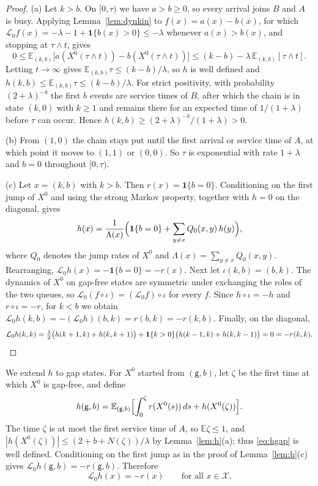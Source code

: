 \documentclass[11pt]{article}
\theoremstyle{definition}
\theoremstyle{remark}
\newcommand{\E}{\mathbb{E}}
\newcommand{\ind}{\mathbf{1}}
\newcommand{\cX}{\mathcal{X}}
\newcommand{\cL}{\mathcal{L}}
\newcommand{\gp}{\mathsf{g}}
\begin{document}
\begin{proof}
(a) Let $k>b$. On $[0,\tau)$ we have $a>b\ge0$, so every arrival joins $B$ and
$A$ is busy. Applying Lemma~\ref{lem:dynkin} to $f(x)=a(x)-b(x)$, for which
$\cL_0f(x)=-\lambda-1+\ind\{b(x)>0\}\le-\lambda$ whenever $a(x)>b(x)$, and
stopping at $\tau\wedge t$, gives
\[
  0\le\E_{(k,b)}\bigl[a(X^0(\tau\wedge t))-b(X^0(\tau\wedge t))\bigr]
  \le (k-b)-\lambda\,\E_{(k,b)}[\tau\wedge t].
\]
Letting $t\to\infty$ gives $\E_{(k,b)}\tau\le(k-b)/\lambda$, so $h$ is well
defined and $h(k,b)\le\E_{(k,b)}\tau\le(k-b)/\lambda$. For strict positivity,
with probability $(2+\lambda)^{-b}$ the first $b$ events are service times of
$B$, after which the chain is in state $(k,0)$ with $k\ge1$ and remains there
for an expected time of $1/(1+\lambda)$ before $\tau$ can occur. Hence
$h(k,b)\ge(2+\lambda)^{-b}/(1+\lambda)>0$.

(b) From $(1,0)$ the chain stays put until the first arrival or service time
of $A$, at which point it moves to $(1,1)$ or $(0,0)$. So $\tau$ is exponential
with rate $1+\lambda$ and $b=0$ throughout $[0,\tau)$.

(c) Let $x=(k,b)$ with $k>b$. Then $r(x)=\ind\{b=0\}$. Conditioning on the
first jump of $X^0$ and using the strong Markov property, together with
$h=0$ on the diagonal, gives
\[
  h(x)=\frac{1}{\Lambda(x)}\Bigl(\ind\{b=0\}+\sum_{y\ne x}Q_0(x,y)\,h(y)\Bigr),
\]
where $Q_0$ denotes the jump rates of $X^0$ and
$\Lambda(x)=\sum_{y\ne x}Q_0(x,y)$. Rearranging, $\cL_0h(x)=-\ind\{b=0\}=-r(x)$.
Next let $\iota(k,b)=(b,k)$. The dynamics of $X^0$ on gap-free states are
symmetric under exchanging the roles of the two queues, so
$\cL_0(f\circ\iota)=(\cL_0f)\circ\iota$ for every $f$. Since $h\circ\iota=-h$
and $r\circ\iota=-r$, for $k<b$ we obtain
$\cL_0h(k,b)=-(\cL_0h)(b,k)=r(b,k)=-r(k,b)$. Finally, on the diagonal,
\[
  \cL_0h(k,k)=\tfrac{\lambda}{2}\bigl(h(k+1,k)+h(k,k+1)\bigr)
  +\ind\{k>0\}\bigl(h(k-1,k)+h(k,k-1)\bigr)=0=-r(k,k).\qedhere
\]
\end{proof}

We extend $h$ to gap states. For $X^0$ started from $(\gp,b)$, let $\zeta$ be
the first time at which $X^0$ is gap-free, and define
\begin{equation}\label{eq:hgap}
  h(\gp,b)=\E_{(\gp,b)}\Bigl[\int_0^{\zeta}r(X^0(s))\,ds+h(X^0(\zeta))\Bigr].
\end{equation}
The time $\zeta$ is at most the first service time of $A$, so $\E\zeta\le1$,
and $|h(X^0(\zeta))|\le(2+b+N(\zeta))/\lambda$ by Lemma~\ref{lem:h}(a); thus
\eqref{eq:hgap} is well defined. Conditioning on the first jump as in the proof
of Lemma~\ref{lem:h}(c) gives $\cL_0h(\gp,b)=-r(\gp,b)$. Therefore
\begin{equation}\label{eq:poisson}
  \cL_0h(x)=-r(x)\qquad\text{for all }x\in\cX .
\end{equation}
\end{document}
